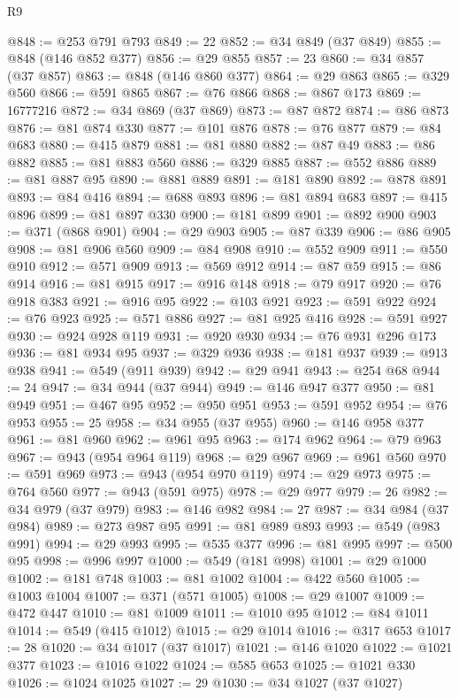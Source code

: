 \begin{lexlean}{R9}
\begin{coremodule}
@848 := @253 @791 @793
@849 := 22
@852 := @34 @849 (@37 @849)
@855 := @848 (@146 @852 @377)
@856 := @29 @855
@857 := 23
@860 := @34 @857 (@37 @857)
@863 := @848 (@146 @860 @377)
@864 := @29 @863
@865 := @329 @560
@866 := @591 @865
@867 := @76 @866
@868 := @867 @173
@869 := 16777216
@872 := @34 @869 (@37 @869)
@873 := @87 @872
@874 := @86 @873
@876 := @81 @874 @330
@877 := @101 @876
@878 := @76 @877
@879 := @84 @683
@880 := @415 @879
@881 := @81 @880
@882 := @87 @49
@883 := @86 @882
@885 := @81 @883 @560
@886 := @329 @885
@887 := @552 @886
@889 := @81 @887 @95
@890 := @881 @889
@891 := @181 @890
@892 := @878 @891
@893 := @84 @416
@894 := @688 @893
@896 := @81 @894 @683
@897 := @415 @896
@899 := @81 @897 @330
@900 := @181 @899
@901 := @892 @900
@903 := @371 (@868 @901)
@904 := @29 @903
@905 := @87 @339
@906 := @86 @905
@908 := @81 @906 @560
@909 := @84 @908
@910 := @552 @909
@911 := @550 @910
@912 := @571 @909
@913 := @569 @912
@914 := @87 @59
@915 := @86 @914
@916 := @81 @915
@917 := @916 @148
@918 := @79 @917
@920 := @76 @918 @383
@921 := @916 @95
@922 := @103 @921
@923 := @591 @922
@924 := @76 @923
@925 := @571 @886
@927 := @81 @925 @416
@928 := @591 @927
@930 := @924 @928 @119
@931 := @920 @930
@934 := @76 @931 @296 @173
@936 := @81 @934 @95
@937 := @329 @936
@938 := @181 @937
@939 := @913 @938
@941 := @549 (@911 @939)
@942 := @29 @941
@943 := @254 @68
@944 := 24
@947 := @34 @944 (@37 @944)
@949 := @146 @947 @377
@950 := @81 @949
@951 := @467 @95
@952 := @950 @951
@953 := @591 @952
@954 := @76 @953
@955 := 25
@958 := @34 @955 (@37 @955)
@960 := @146 @958 @377
@961 := @81 @960
@962 := @961 @95
@963 := @174 @962
@964 := @79 @963
@967 := @943 (@954 @964 @119)
@968 := @29 @967
@969 := @961 @560
@970 := @591 @969
@973 := @943 (@954 @970 @119)
@974 := @29 @973
@975 := @764 @560
@977 := @943 (@591 @975)
@978 := @29 @977
@979 := 26
@982 := @34 @979 (@37 @979)
@983 := @146 @982
@984 := 27
@987 := @34 @984 (@37 @984)
@989 := @273 @987 @95
@991 := @81 @989 @893
@993 := @549 (@983 @991)
@994 := @29 @993
@995 := @535 @377
@996 := @81 @995
@997 := @500 @95
@998 := @996 @997
@1000 := @549 (@181 @998)
@1001 := @29 @1000
@1002 := @181 @748
@1003 := @81 @1002
@1004 := @422 @560
@1005 := @1003 @1004
@1007 := @371 (@571 @1005)
@1008 := @29 @1007
@1009 := @472 @447
@1010 := @81 @1009
@1011 := @1010 @95
@1012 := @84 @1011
@1014 := @549 (@415 @1012)
@1015 := @29 @1014
@1016 := @317 @653
@1017 := 28
@1020 := @34 @1017 (@37 @1017)
@1021 := @146 @1020
@1022 := @1021 @377
@1023 := @1016 @1022
@1024 := @585 @653
@1025 := @1021 @330
@1026 := @1024 @1025
@1027 := 29
@1030 := @34 @1027 (@37 @1027)

\end{coremodule}
\end{lexlean}
